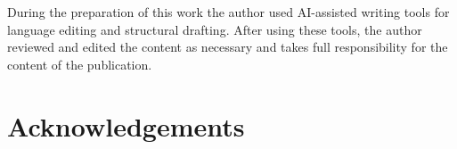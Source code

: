 During the preparation of this work the author used AI-assisted writing tools for
language editing and structural drafting. After using these tools, the author reviewed
and edited the content as necessary and takes full responsibility for the content of
the publication.

\section*{Acknowledgements}

